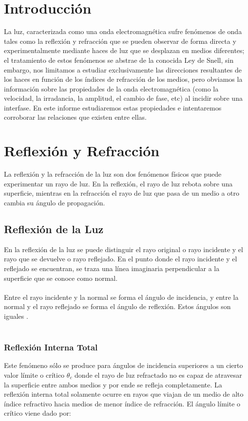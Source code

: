 \documentclass[
aps,
reprint,
amsmath, amssymb,
superscriptaddress,
]{revtex4-2}
\begin{document}
\section{Introducción}
La luz, caracterizada como una onda electromagnética sufre fenómenos de onda tales como la reflexión y refracción que se pueden observar de forma directa y experimentalmente mediante haces de luz que se desplazan en medios diferentes; el tratamiento de estos fenómenos se abstrae de la conocida Ley de Snell, sin embargo, nos limitamos a estudiar exclusivamente las direcciones resultantes de los haces en función de los índices de refracción de los medios, pero obviamos la información sobre las propiedades de la onda electromagnética (como la velocidad, la irradancia, la amplitud, el cambio de fase, etc)  al incidir sobre una interfase. En este informe estudiaremos estas propiedades e intentaremos corroborar las relaciones que existen entre ellas.

\section{Reflexión y Refracción}
La reflexión y la refracción de la luz son dos fenómenos físicos que puede experimentar un rayo de luz. En la reflexión, el rayo de luz rebota sobre una superficie, mientras en la refracción el rayo de luz que pasa de un medio a otro cambia su ángulo de propagación.

\subsection{Reflexión de la Luz}

En la reflexión de la luz se puede distinguir el rayo original o rayo incidente y el rayo que se devuelve o rayo reflejado. En el punto donde el rayo incidente y el reflejado se encuentran, se traza una línea imaginaria perpendicular a la superficie que se conoce como normal.\\
\\
Entre el rayo incidente y la normal se forma el ángulo de incidencia, y entre la normal y el rayo reflejado se forma el ángulo de reflexión. Estos ángulos son iguales \cite{optics}.\\
\\
\subsubsection{Reflexión Interna Total}

Este fenómeno sólo se produce para ángulos de incidencia superiores a un cierto valor límite o crítico $\theta_c$ donde el rayo de luz refractado no es capaz de atravesar la superficie entre ambos medios y por ende se refleja completamente. La reflexión interna total solamente ocurre en rayos que viajan de un medio de alto índice refractivo hacia medios de menor índice de refracción. El ángulo límite o crítico viene dado por: 
\end{document}

